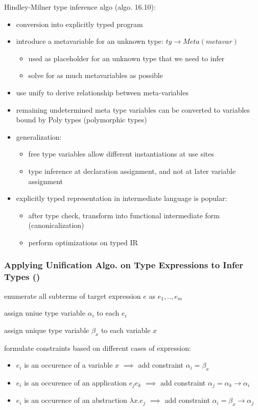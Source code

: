 \documentclass[8pt]{extarticle}
\begin{document}
\begin{multicols*}{2}
  Hindley-Milner type inference algo (algo. 16.10):
  \begin{itemize}
  \item conversion into explicitly typed program
  \item introduce a metavariable for an unknown type: $ty \rightarrow Meta(metavar)$
    \begin{itemize}
    \item used as placeholder for an unknown type that we need to infer
    \item solve for as much metavariables as possible
    \end{itemize}
  \item use unify to derive relationship between meta-variables
  \item remaining undetermined meta type variables can be converted to variables bound by Poly types (polymorphic types)
  \item generalization:
    \begin{itemize}
    \item free type variables allow different instantiations at use sites
    \item type inference at declaration assignment, and not at later variable assignment
    \end{itemize}
  \item explicitly typed representation in intermediate language is popular:
    \begin{itemize}
    \item after type check, transform into functional intermediate form (canonicalization)
    \item perform optimizations on typed IR
    \end{itemize}
  \end{itemize}

  \subsubsection{Applying Unification Algo. on Type Expressions to Infer Types (\cite{cs6110})}

  enumerate all subterms of target expression $e$ as $e_1, .., e_m$

  assign uniue type variable $\alpha_i$ to each $e_i$

  assign unique type variable $\beta_x$ to each variable $x$

  formulate constraints based on different cases of expression:
  \begin{itemize}
  \item $e_i$ is an occurence of a variable $x$ $\implies$ add constraint $\alpha_i=\beta_x$
  \item $e_i$ is an occurence of an application $e_j e_k$ $\implies$ add constraint $\alpha_j=\alpha_k \rightarrow \alpha_i$
  \item $e_i$ is an occurence of an abstraction $\lambda x.e_j$ $\implies$ add constraint $\alpha_i=\beta_x \rightarrow \alpha_j$
  \end{itemize}


\end{multicols*}
\end{document}
